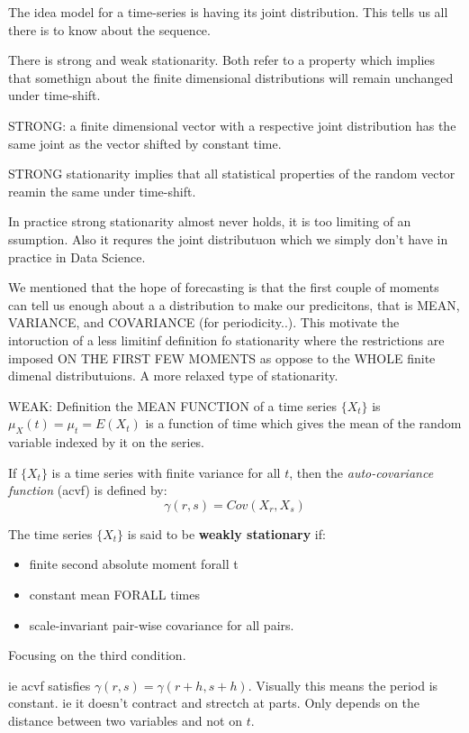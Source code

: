 \documentclass{article}
\begin{document}
The idea model for a time-series is having its joint distribution. This tells us all there is to know about the sequence. 

There is strong and weak stationarity. Both refer to a property which implies that somethign about the finite dimensional distributions will remain unchanged under time-shift. 

STRONG: a finite dimensional vector with a respective joint distribution has the same joint as the vector shifted by constant time. 

STRONG stationarity implies that all statistical properties of the random vector reamin the same under time-shift. 

In practice strong stationarity almost never holds, it is too limiting of an ssumption. Also it requres the joint distributuon which we simply don't have in practice in Data Science. 

We mentioned that the hope of forecasting is that the first couple of moments can tell us enough about a a distribution to make our predicitons, that is MEAN, VARIANCE, and COVARIANCE (for periodicity..). This motivate the intoruction of a less limitinf definition fo stationarity where the restrictions are imposed ON THE FIRST FEW MOMENTS as oppose to the WHOLE finite dimenal distributuions. A more relaxed type of stationarity.

WEAK: 
Definition the MEAN FUNCTION of a time series $\{X_t\}$ is $\mu_X(t) = \mu_t = E(X_t)$ is a function of time which gives the mean of the random variable indexed by it on the series. 

If $\{X_t \}$ is a time series with finite variance for all $t$, then the \textit{auto-covariance function} (acvf) is defined by:
\[ \gamma(r, s)=Cov(X_r, X_s) \]


The time series $\{X_t\}$ is said to be \textbf{weakly stationary} if:
\begin{itemize}
\item finite second absolute moment forall t
\item constant mean FORALL times
\item scale-invariant pair-wise covariance for all pairs. 
\end{itemize}

Focusing on the third condition.

ie acvf satisfies $\gamma(r,s) = \gamma(r+h, s+h)$. Visually this means the period is constant. ie it doesn't contract and strectch at parts. Only depends on the distance between two variables and not on $t$.
\end{document}
